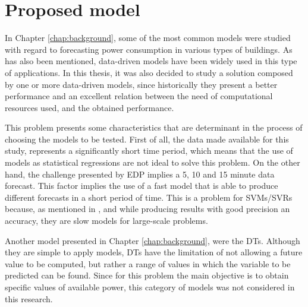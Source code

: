 
\section{Proposed model}\label{chap3:sec:proposed_model}

In Chapter \ref{chap:background}, some of the most common models were studied with regard to forecasting power consumption in various types of buildings. As has also been mentioned, data-driven models have been widely used in this type of applications. In this thesis, it was also decided to study a solution composed by one or more data-driven models, since historically they present a better performance and an excellent relation between the need of computational resources used, and the obtained performance.

This problem presents some characteristics that are determinant in the process of choosing the models to be tested. First of all, the data made available for this study, represents a significantly short time period, which means that the use of models as statistical regressions are not ideal to solve this problem. On the other hand, the challenge presented by \ac{EDP} implies a 5, 10 and 15 minute data forecast. This factor implies the use of a fast model that is able to produce different forecasts in a short period of time. This is a problem for \ac{SVM}s/\ac{SVR}s because, as mentioned in \cite{svm3}, \cite{svm2} and \cite{svm5} while producing results with good precision an accuracy, they are slow models for large-scale problems. 

Another model presented in Chapter \ref{chap:background}, were the \ac{DT}s. Although they are simple to apply models, \ac{DT}s have the limitation of not allowing a future value to be computed, but rather a range of values in which the variable to be predicted can be found. Since for this problem the main objective is to obtain specific values of available power, this category of models was not considered in this research.

